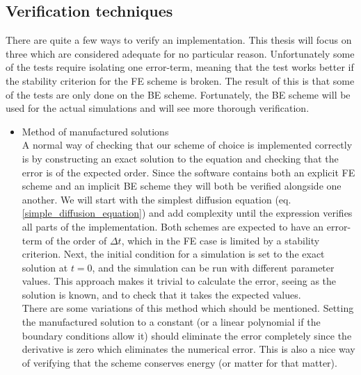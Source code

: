 \subsection{Verification techniques}
There are quite a few ways to verify an implementation. This thesis will focus on three which are considered adequate for no particular reason. 
Unfortunately some of the tests require isolating one error-term, meaning that the test works better if the stability criterion for the FE scheme is broken. 
The result of this is that some of the tests are only done on the BE scheme. 
Fortunately, the BE scheme will be used for the actual simulations and will see more thorough verification.

\begin{itemize}
 \item Method of manufactured solutions\\
 A normal way of checking that our scheme of choice is implemented correctly is by constructing an exact solution to the equation and checking that the error is of the expected order. 
Since the software contains both an explicit FE scheme and an implicit BE scheme they will both be verified alongside one another. 
We will start with the simplest diffusion equation (eq. \eqref{simple_diffusion_equation}) and add complexity until the expression verifies all parts of the implementation. 
Both schemes are expected to have an error-term of the order of $\Delta t$, which in the FE case is limited by a stability criterion. 
Next, the initial condition for a simulation is set to the exact solution at $t=0$, and the simulation can be run with different parameter values. 
This approach makes it trivial to calculate the error, seeing as the solution is known, and to check that it takes the expected values.\\
There are some variations of this method which should be mentioned. 
Setting the manufactured solution to a constant (or a linear polynomial if the boundary conditions allow it) should eliminate the error completely since the derivative is zero which eliminates the numerical error. 
This is also a nice way of verifying that the scheme conserves energy (or matter for that matter).


\end{itemize}

